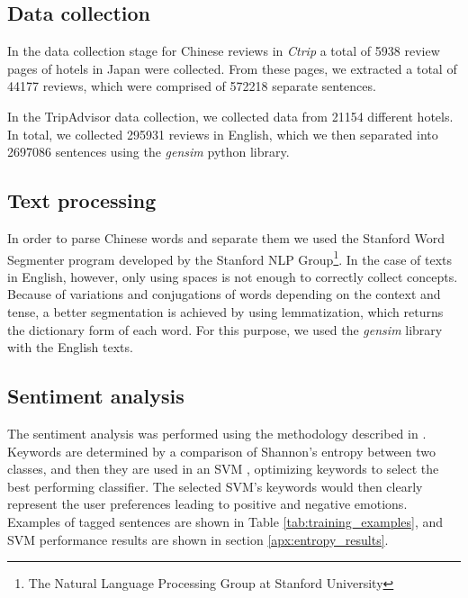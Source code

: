 \subsection{Data collection}\label{datacollection}

In the data collection stage for Chinese reviews in \textit{Ctrip} a total of \num[group-separator={,}]{5938} review pages of hotels in Japan were collected. From these pages, we extracted a total of \num[group-separator={,}]{44177} reviews, which were comprised of \num[group-separator={,}]{572218} separate sentences. 

In the TripAdvisor data collection, we collected data from \num[group-separator={,}]{21154} different hotels. In total, we collected \num[group-separator={,}]{295931} reviews in English, which we then separated into \num[group-separator={,}]{2697086} sentences using the \textit{gensim} python library. 

\subsection{Text processing}\label{textprocessing}

In order to parse Chinese words and separate them we used the Stanford Word Segmenter \cite[][]{chang2008} program developed by the Stanford NLP Group\footnote{\label{stanfordnlp}The Natural Language Processing Group at Stanford University}. In the case of texts in English, however, only using spaces is not enough to correctly collect concepts. Because of variations and conjugations of words depending on the context and tense, a better segmentation is achieved by using lemmatization, which returns the dictionary form of each word. For this purpose, we used the \textit{gensim} library with the English texts.

\subsection{Sentiment analysis}\label{sentimentanalysis}

The sentiment analysis was performed using the methodology described in \cite{Aleman2018ICAROB}. Keywords are determined by a comparison of Shannon's entropy \cite[][]{shannon1948} between two classes, and then they are used in an SVM \cite[][]{cortes1995}, optimizing keywords to select the best performing classifier. The selected SVM's keywords would then clearly represent the user preferences leading to positive and negative emotions. Examples of tagged sentences are shown in Table \ref{tab:training_examples}, and SVM performance results are shown in section \ref{apx:entropy_results}.

